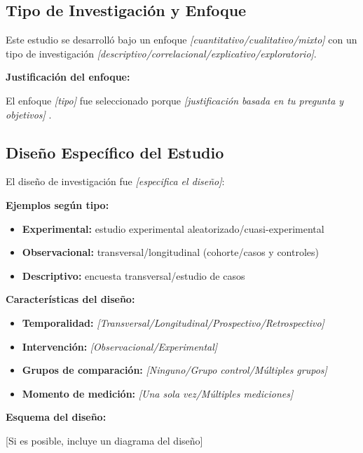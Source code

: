 \subsection{Tipo de Investigación y Enfoque}
\label{subsec:tipo_investigacion}

Este estudio se desarrolló bajo un enfoque \textit{[cuantitativo/cualitativo/mixto]} con un tipo de investigación \textit{[descriptivo/correlacional/explicativo/exploratorio]}.

\textbf{Justificación del enfoque:}

El enfoque \textit{[tipo]} fue seleccionado porque \textit{[justificación basada en tu pregunta y objetivos]} \cite{autor_metodologia}.

\subsection{Diseño Específico del Estudio}
\label{subsec:diseño_especifico}

El diseño de investigación fue \textit{[especifica el diseño]}:

\textbf{Ejemplos según tipo:}
\begin{itemize}
    \item \textbf{Experimental:} estudio experimental aleatorizado/cuasi-experimental
    \item \textbf{Observacional:} transversal/longitudinal (cohorte/casos y controles)
    \item \textbf{Descriptivo:} encuesta transversal/estudio de casos
\end{itemize}

\textbf{Características del diseño:}

\begin{itemize}
    \item \textbf{Temporalidad:} \textit{[Transversal/Longitudinal/Prospectivo/Retrospectivo]}
    \item \textbf{Intervención:} \textit{[Observacional/Experimental]}
    \item \textbf{Grupos de comparación:} \textit{[Ninguno/Grupo control/Múltiples grupos]}
    \item \textbf{Momento de medición:} \textit{[Una sola vez/Múltiples mediciones]}
\end{itemize}

\textbf{Esquema del diseño:}

[Si es posible, incluye un diagrama del diseño]


